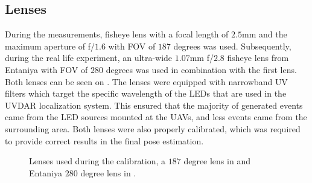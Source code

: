 \subsection{Lenses}
During the measurements, fisheye lens with a focal length of $2.5$mm and the maximum aperture of f/$1.6$ with \ac{FOV} of $187$ degrees was used. Subsequently, during the real life experiment, an ultra-wide $1.07$mm f/$2.8$ fisheye lens from Entaniya with \ac{FOV} of $280$ degrees was used in combination with the first lens. Both lenses can be seen on .
The lenses were equipped with narrowband \ac{UV} filters which target the specific wavelength of the \ac{LED}s that are used in the UVDAR localization system.
This ensured that the majority of generated events came from the \ac{LED} sources mounted at the \ac{UAV}s, and less events came from the surrounding area.
Both lenses were also properly calibrated, which was required to provide correct results in the final pose estimation.
\begin{figure}[H]
	\centering
	\caption{
		Lenses used during the calibration, a $187$ degree lens in  and Entaniya $280$ degree lens in .
  }
	\label{fig:lenses}
\end{figure}

